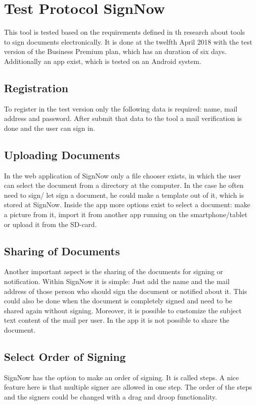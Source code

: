 \section{Test Protocol SignNow}
\label{sec:signnow}
This tool is tested based on the requirements defined in th research about tools to sign documents electronically. It is done at the twelfth April 2018 with the test version of the Business Premium plan, which has an duration of six days. Additionally an \gls{app} exist, which is tested on an Android system.

\subsection{Registration}
To register in the test version only the following data is required: name, mail address and password. After submit that data to the tool a mail verification is done and the user can sign in.

\subsection{Uploading Documents}
In the web application of SignNow only a file chooser exists, in which the user can select the document from a directory at the computer. In the case he often need to sign/ let sign a document, he could make a template out of it, which is stored at SignNow. Inside the \gls{app} more options exist to select a document: make a picture from it, import it from another \gls{app} running on the smartphone/tablet or upload it from the SD-card.  

\subsection{Sharing of Documents}
Another important aspect is the sharing of the documents for signing or notification. Within SignNow it is simple: Just add the name and the mail address of those person who should sign the document or notified about it. This could also be done when the document is completely signed and need to be shared again without signing. Moreover, it is possible to customize the subject text content of the mail per user. In the \gls{app} it is not possible to share the document.

\subsection{Select Order of Signing}
SignNow has the option to make an order of signing. It is called steps. A nice feature here is that multiple signer are allowed in one step. The order of the steps and the signers could be changed with a drag and droop functionality.


